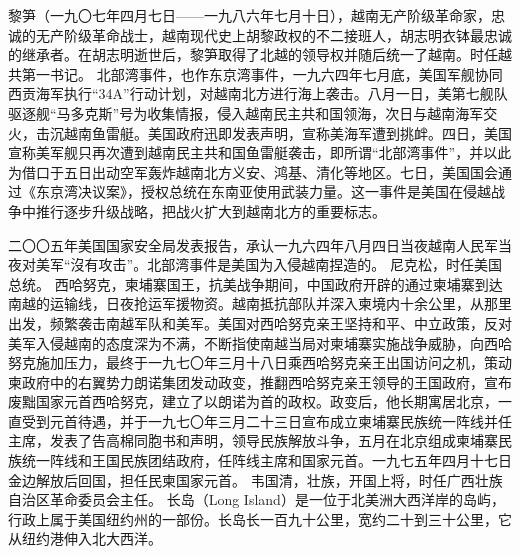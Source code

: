 \begin{maonote}
黎笋（一九〇七年四月七日——一九八六年七月十日），越南无产阶级革命家，忠诚的无产阶级革命战士，越南现代史上胡黎政权的不二接班人，胡志明衣钵最忠诚的继承者。在胡志明逝世后，黎笋取得了北越的领导权并随后统一了越南。时任越共第一书记。
北部湾事件，也作东京湾事件，一九六四年七月底，美国军舰协同西贡海军执行“34A”行动计划，对越南北方进行海上袭击。八月一日，美第七舰队驱逐舰“马多克斯”号为收集情报，侵入越南民主共和国领海，次日与越南海军交火，击沉越南鱼雷艇。美国政府迅即发表声明，宣称美海军遭到挑衅。四日，美国宣称美军舰只再次遭到越南民主共和国鱼雷艇袭击，即所谓“北部湾事件”，并以此为借口于五日出动空军轰炸越南北方义安、鸿基、清化等地区。七日，美国国会通过《东京湾决议案》，授权总统在东南亚使用武装力量。这一事件是美国在侵越战争中推行逐步升级战略，把战火扩大到越南北方的重要标志。

二〇〇五年美国国家安全局发表报告，承认一九六四年八月四日当夜越南人民军当夜对美军“沒有攻击”。北部湾事件是美国为入侵越南捏造的。
尼克松，时任美国总统。
西哈努克，柬埔寨国王，抗美战争期间，中国政府开辟的通过柬埔寨到达南越的运输线，日夜抢运军援物资。越南抵抗部队并深入柬境内十余公里，从那里出发，频繁袭击南越军队和美军。美国对西哈努克亲王坚持和平、中立政策，反对美军入侵越南的态度深为不满，不断指使南越当局对柬埔寨实施战争威胁，向西哈努克施加压力，最终于一九七〇年三月十八日乘西哈努克亲王出国访问之机，策动柬政府中的右翼势力朗诺集团发动政变，推翻西哈努克亲王领导的王国政府，宣布废黜国家元首西哈努克，建立了以朗诺为首的政权。政变后，他长期寓居北京，一直受到元首待遇，并于一九七〇年三月二十三日宣布成立柬埔寨民族统一阵线并任主席，发表了告高棉同胞书和声明，领导民族解放斗争，五月在北京组成柬埔寨民族统一阵线和王国民族团结政府，任阵线主席和国家元首。一九七五年四月十七日金边解放后回国，担任民柬国家元首。
韦国清，壮族，开国上将，时任广西壮族自治区革命委员会主任。
长岛（Long Island）是一位于北美洲大西洋岸的岛屿，行政上属于美国纽约州的一部份。长岛长一百九十公里，宽约二十到三十公里，它从纽约港伸入北大西洋。
\end{maonote}
